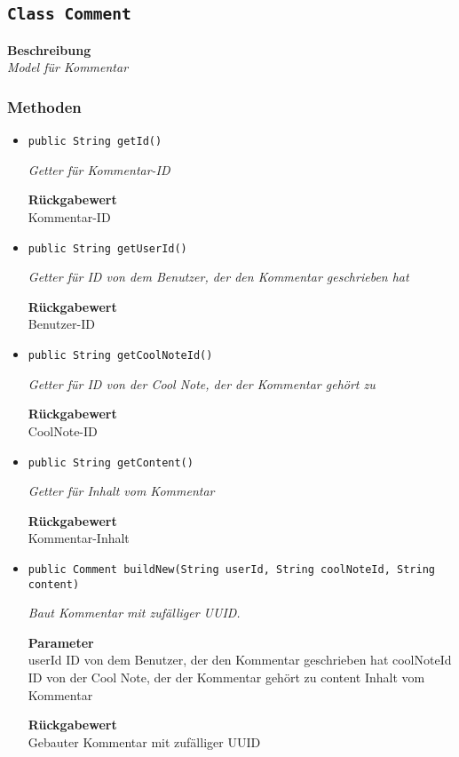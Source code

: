     \subsection{\texttt{Class Comment}}
    \textbf{Beschreibung} \\
    \textit{Model für Kommentar}
    \subsubsection{Methoden}
    \begin{itemize}
    	\item{\texttt{public String getId()}}
    	
    	\textit{Getter für Kommentar-ID}
    	
    	
    	
    	\textbf{Rückgabewert} \\
    	Kommentar-ID        \item{\texttt{public String getUserId()}}
    	
    	\textit{Getter für ID von dem Benutzer, der den Kommentar geschrieben hat}
    	
    	
    	
    	\textbf{Rückgabewert} \\
    	Benutzer-ID        \item{\texttt{public String getCoolNoteId()}}
    	
    	\textit{Getter für ID von der Cool Note, der der Kommentar gehört zu}
    	
    	
    	
    	\textbf{Rückgabewert} \\
    	CoolNote-ID        \item{\texttt{public String getContent()}}
    	
    	\textit{Getter für Inhalt vom Kommentar}
    	
    	
    	
    	\textbf{Rückgabewert} \\
    	Kommentar-Inhalt        \item{\texttt{public Comment buildNew(String userId, String coolNoteId, String content)}}
    	
    	\textit{Baut Kommentar mit zufälliger UUID.}
    	
    	\textbf{Parameter} \\
    	userId ID von dem Benutzer, der den Kommentar geschrieben hat
    	coolNoteId ID von der Cool Note, der der Kommentar gehört zu
    	content Inhalt vom Kommentar
    	
    	\textbf{Rückgabewert} \\
    	Gebauter Kommentar mit zufälliger UUID
    \end{itemize}
